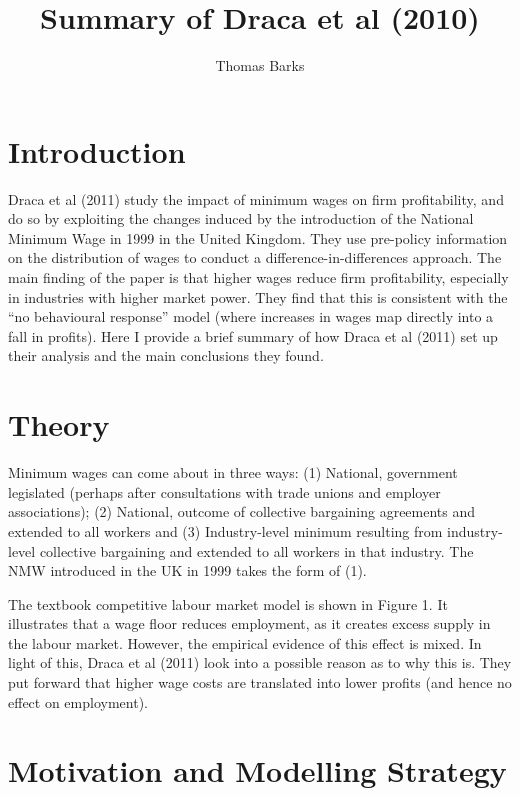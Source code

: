 \documentclass[12pt]{article}
\begin{document}
 

\title{Summary of Draca et al (2010)}
\author{Thomas Barks}

\maketitle

\section{Introduction}

Draca et al (2011) study the impact of minimum wages on firm profitability, and do so by exploiting the changes induced by the introduction of the National Minimum Wage in 1999 in the United Kingdom. They use pre-policy information on the distribution of wages to conduct a difference-in-differences approach. The main finding of the paper is that higher wages reduce firm profitability, especially in industries with higher market power. They find that this is consistent with the “no behavioural response” model (where increases in wages map directly into a fall in profits). Here I provide a brief summary of how Draca et al (2011) set up their analysis and the main conclusions they found.

\section{Theory}

Minimum wages can come about in three ways: (1) National, government legislated (perhaps after consultations with trade unions and employer associations); (2) National, outcome of collective bargaining agreements and extended to all workers and (3) Industry-level minimum resulting from industry-level collective bargaining and extended to all workers in that industry. The NMW introduced in the UK in 1999 takes the form of (1).

The textbook competitive labour market model is shown in Figure 1. It illustrates that a wage floor reduces employment, as it creates excess supply in the labour market. However, the empirical evidence of this effect is mixed. In light of this, Draca et al (2011) look into a possible reason as to why this is. They put forward that higher wage costs are translated into lower profits (and hence no effect on employment).

\section{Motivation and Modelling Strategy}
\end{document}
